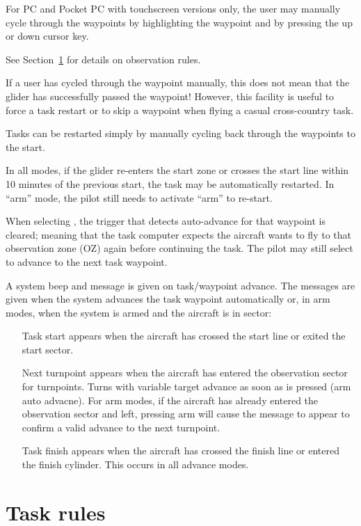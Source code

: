 \documentclass[a4paper,12pt]{refrep}
\begin{document}
For PC and Pocket PC with touchscreen versions only, the user may
manually cycle through the waypoints by highlighting the waypoint
{\InfoBox} and by pressing the up or down cursor key.

See Section~\ref{sec:task-rules} for details on observation rules.

If a user has cycled through the waypoint manually, this does not mean
that the glider has successfully passed the waypoint!  However, this
facility is useful to force a task restart or to skip a waypoint when
flying a casual cross-country task.

\tip Tasks can be restarted simply by manually cycling back through the
waypoints to the start.

In all modes, if the glider re-enters the start zone or crosses the
start line within 10 minutes of the previous start, the task may be
automatically restarted.  In ``arm'' mode, the pilot still
needs to activate ``arm'' to re-start.

When selecting , the trigger that detects
auto-advance for that waypoint is cleared; meaning that the task
computer expects the aircraft wants to fly to that observation zone (OZ)
again before continuing the task.  The pilot may still select  to advance to the next task waypoint.

A system beep and message is given on task/waypoint advance.  The
messages are given when the system advances the task waypoint
automatically or, in arm modes, when the system is armed and the
aircraft is in sector:
\begin{itemize}
\item[Task start]  appears when the aircraft has crossed the start line or
 exited the start sector. 
\item[Next turnpoint]  appears when the aircraft has entered the observation
 sector for turnpoints. Turns with variable target advance as soon as
  is pressed (arm auto advacne).  For arm modes, if the aircraft has 
 already entered the observation sector and left, pressing arm will
 cause the message to appear to confirm a valid advance to the next
 turnpoint.
\item[Task finish]  appears when the aircraft has crossed the finish line
 or entered the finish cylinder.  This occurs in all advance modes. 
\end{itemize}

\section{Task rules}\label{sec:task-rules}
\end{document}
